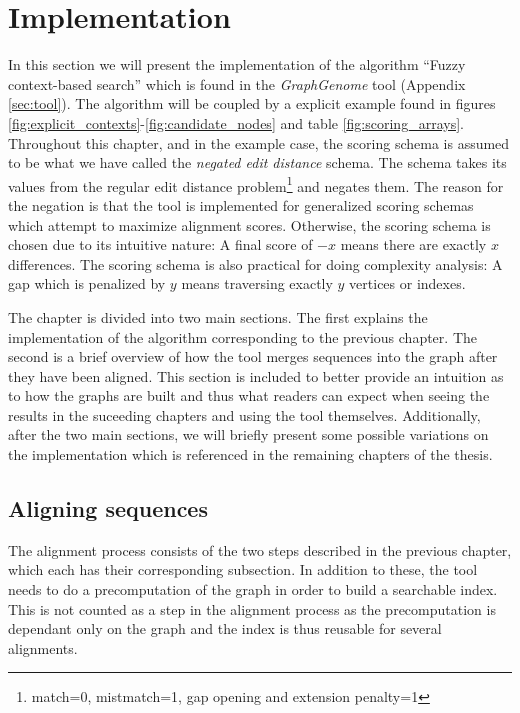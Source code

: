 \documentclass[thesis.tex]{subfiles}
\begin{document}
\chapter{Implementation}
In this section we will present the implementation of the algorithm ``Fuzzy context-based search'' which is found in the \textit{GraphGenome} tool (Appendix \ref{sec:tool}). The algorithm will be coupled by a explicit example found in figures \ref{fig:explicit_contexts}-\ref{fig:candidate_nodes} and table \ref{fig:scoring_arrays}. Throughout this chapter, and in the example case, the scoring schema is assumed to be what we have called the \textit{negated edit distance} schema. The schema takes its values from the regular edit distance problem\footnote{match=0, mistmatch=1, gap opening and extension penalty=1} and negates them. The reason for the negation is that the tool is implemented for generalized scoring schemas which attempt to maximize alignment scores.  Otherwise, the scoring schema is chosen due to its intuitive nature: A final score of $-x$ means there are exactly $x$ differences. The scoring schema is also practical for doing complexity analysis: A gap which is penalized by $y$ means traversing exactly $y$ vertices or indexes.\\
\par\noindent
The chapter is divided into two main sections. The first explains the implementation of the algorithm corresponding to the previous chapter. The second is a brief overview of how the tool merges sequences into the graph after they have been aligned. This section is included to better provide an intuition as to how the graphs are built and thus what readers can expect when seeing the results in the suceeding chapters and using the tool themselves. Additionally, after the two main sections, we will briefly present some possible variations on the implementation which is referenced in the remaining chapters of the thesis.
\section{Aligning sequences}
The alignment process consists of the two steps described in the previous chapter, which each has their corresponding subsection. In addition to these, the tool needs to do a precomputation of the graph in order to build a searchable index. This is not counted as a step in the alignment process as the precomputation is dependant only on the graph and the index is thus reusable for several alignments.
\end{document}
